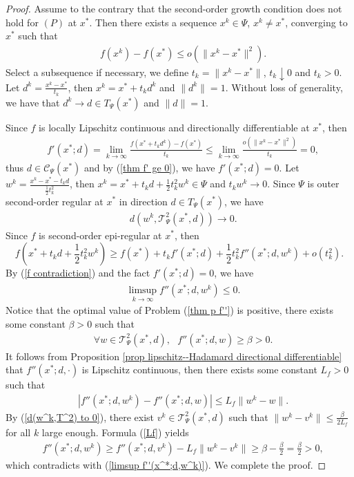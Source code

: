 \documentclass[11pt]{article}
\theoremstyle{definition}
\theoremstyle{remark}
\numberwithin{equation}{section}
\begin{document}
\begin{proof}
 Assume to the contrary that the second-order growth condition does not hold for $(P)$ at $x^*$.
  Then there exists a sequence $x^k\in \Psi$, $x^k\neq x^*$, converging to $x^*$ such that
\begin{align}\label{f contradiction}
  & f(x^k)-f(x^*)\le o(\|x^k-x^*\|^2).
\end{align}
  Select a subsequence if necessary, we define $t_k=\|x^k-x^*\|$, $t_k\downarrow 0$ and $t_k>0$. Let
$d^k=\frac{x^k-x^*}{t_k}$, then $x^k=x^*+t_k d^k$ and $\|d^k\|=1$. Without loss of generality, we have that $d^k\to d\in T_{\Psi}(x^*) $
and $\|d\|=1$.

Since $f$ is locally Lipschitz continuous and directionally differentiable at $x^*$,
then
\begin{align*}
   & f'(x^*;d)=\lim_{k\to \infty}\frac{f(x^*+t_k d^k)-f(x^*)}{t_k}
   \le \lim_{k\to \infty}\frac{o(\|x^k-x^*\|^2)}{t_k}=0,
\end{align*}
thus $d\in \mathcal{C}_{\Psi}(x^*)$ and by (\ref{thm f' ge 0}), we have $f'(x^*;d)=0$.
Let $w^k=\frac{x^k-x^*-t_k d}{\frac{1}{2}t_k^2}$, then $x^k=x^*+t_k d+\frac{1}{2}t_k^2w^k\in \Psi$ and $t_kw^k\to
0$. Since $\Psi$ is outer second-order regular
at $x^*$ in  direction $d\in T_{\Psi}(x^*)$, we have
 \begin{align}\label{d(w^k,T^2) to 0}
   &d(w^k,\mathcal{T}^2_{\Psi}(x^*,d))\to 0.
 \end{align}
  Since $f$ is second-order  epi-regular at $x^*$, then
 $$f(x^*+t_k d+\frac{1}{2}t_k^2w^k) \ge f(x^*)+t_k f'(x^*;d)+\frac{1}{2}t_k^2 f''(x^*;d,w^k)+o(t_k^2).$$
 By
 (\ref{f contradiction}) and the fact $f'(x^*;d)=0$, we have
 \begin{align}\label{limsup f''(x^*;d,w^k)}
   & \limsup_{k\to \infty}f''(x^*;d,w^k)\le 0.
 \end{align}
 Notice that the optimal value of Problem (\ref{thm p f''}) is positive,
 there exists some constant $\beta>0$ such that
 \begin{align*}
    & \forall w\in \mathcal{T}^2_{\Psi}(x^*,d),~~~f''(x^*;d,w)\ge \beta >0.
 \end{align*}
It follows from Proposition \ref{prop lipschitz--Hadamard directional differentiable} that $f''(x^*;d,\cdot)$ is
Lipschitz continuous, then there exists some constant $L_f>0$ such that
\begin{align}\label{Lf}
   & |f''(x^*;d,w^k)-f''(x^*;d,w)|\le L_{f}\|w^k-w\|.
\end{align}
By (\ref{d(w^k,T^2) to 0}), there exist $v^k\in \mathcal{T}^2_{\Psi}(x^*,d)$ such that $\|w^k-v^k\|\le
\frac{\beta}{2L_f}$ for all $k$ large enough.
Formula (\ref{Lf}) yields
\begin{align*}
   & f''(x^*;d,w^k)\ge f''(x^*;d,v^k)-L_f\|w^k-v^k\|\ge \beta-\frac{\beta}{2}=\frac{\beta}{2}>0,
\end{align*}
 which contradicts with (\ref{limsup f''(x^*;d,w^k)}). We complete the proof.
\end{proof}
\end{document}
